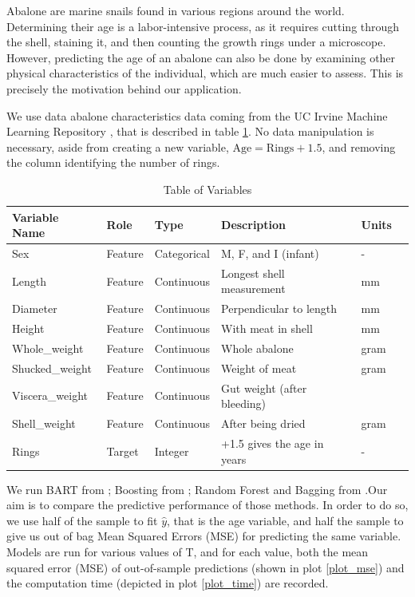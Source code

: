 \documentclass[a4paper,11pt]{article}
\begin{document}
Abalone are marine snails found in various regions around the world. Determining their age is a labor-intensive process, as it requires cutting through the shell, staining it, and then counting the growth rings under a microscope. However, predicting the age of an abalone can also be done by examining other physical characteristics of the individual, which are much easier to assess. This is precisely the motivation behind our application.

We use data abalone characteristics data coming from the UC Irvine Machine Learning Repository \parencite{warwicknashAbalone1994a}, that is described in table \ref{table1}. No data manipulation is necessary, aside from creating a new variable, \( \text{Age} = \text{Rings} + 1.5 \), and removing the column identifying the number of rings.

\begin{table}[]
  \centering
  \begin{tabular}{llllll}

  \toprule
  Variable Name & Role & Type & Description & Units \\
  \midrule
  Sex                  & Feature       & Categorical   & M, F, and I (infant) & -    \\
  Length               & Feature       & Continuous    & Longest shell measurement & mm\\
  Diameter             & Feature       & Continuous    & Perpendicular to length & mm  \\
  Height               & Feature       & Continuous    & With meat in shell      & mm  \\
  Whole\_weight         & Feature       & Continuous    & Whole abalone           & gram\\
  Shucked\_weight       & Feature       & Continuous    & Weight of meat          & gram\\
  Viscera\_weight       & Feature       & Continuous    & Gut weight (after bleeding) & \\
  Shell\_weight         & Feature       & Continuous    & After being dried       & gram\\
  Rings                & Target        & Integer       & +1.5 gives the age in years & - \\

   \bottomrule
  \end{tabular}
  \caption{Table of Variables}
  \label{table1}
  \end{table}

We run BART from \cite{mccullochBARTBayesianAdditive2024}; Boosting from \cite{ridgewayGbmGeneralizedBoosted2024}; Random Forest and Bagging from \cite{breimanRandomForestBreimanCutlers2024}.Our aim is to compare the predictive performance of those methods. In order to do so, we use half of the sample to fit $\hat{y}$, that is the age variable, and half the sample to give us out of bag Mean Squared Errors (MSE) for predicting the same variable. Models are run for various values of T, and for each value, both the mean squared error (MSE) of out-of-sample predictions (shown in plot \ref{plot_mse}) and the computation time (depicted in plot \ref{plot_time}) are recorded.
\end{document}
